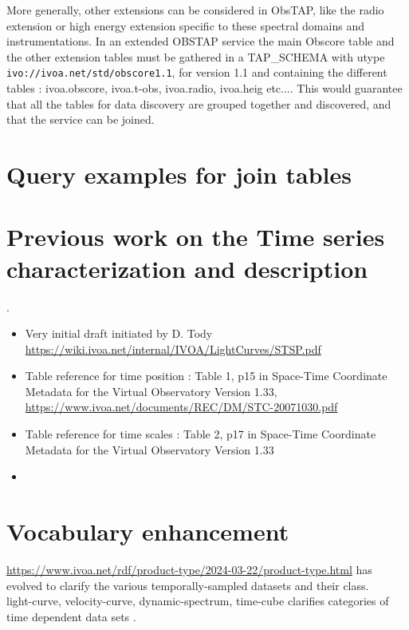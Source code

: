 \documentclass[11pt,a4paper]{ivoa}
\begin{document}
More generally, other extensions can be considered in ObsTAP, like the radio extension or high energy extension specific to these spectral domains and instrumentations. 
In an extended OBSTAP service the main Obscore table and the other extension tables must be gathered in a TAP\_SCHEMA with utype  \texttt{ivo://ivoa.net/std/obscore1.1}, for version 1.1 and containing the different tables : ivoa.obscore, ivoa.t-obs, ivoa.radio, ivoa.heig etc....
This would guarantee that all the tables for data discovery are grouped together and discovered, and that the service can be joined.


  
\appendix


\appendix 
\label{sec:query_examples}

\section{Query examples for join tables}
\appendix
\section{Previous work on the Time series characterization and description}. 

\begin{itemize}  
\item Very initial draft initiated by D. Tody
\url{https://wiki.ivoa.net/internal/IVOA/LightCurves/STSP.pdf}
\item Table reference for time position : Table 1, p15 in Space-Time Coordinate Metadata for the Virtual Observatory
Version 1.33, \url{https://www.ivoa.net/documents/REC/DM/STC-20071030.pdf} 
\item Table reference for time scales :  Table 2, p17 in Space-Time Coordinate Metadata for the Virtual Observatory
Version 1.33
\item 
\end{itemize} 

\section{Vocabulary enhancement}
 \url{https://www.ivoa.net/rdf/product-type/2024-03-22/product-type.html}
has evolved to clarify the various temporally-sampled datasets and their class. \\
light-curve, velocity-curve, dynamic-spectrum, time-cube clarifies categories of time dependent data sets .
\end{document}
